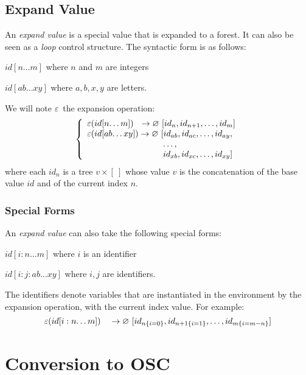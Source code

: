 \documentclass[runningheads,a4paper]{llncs}
\newcommand{\forest}	{\ensuremath{\varnothing}}
\newcommand{\etc}		{\ensuremath{\text{…}}}
\newcommand{\emptyf}	{\ensuremath{[\ ]}}
\newcommand{\nexpand}	{\ensuremath{\varepsilon}}
\newcommand{\ulb}		{\hspace*{31.5mm}}
\begin{document}
\subsection{Expand Value}

An \emph{expand value} is a special value that is expanded to a forest. It can also be seen as a \emph{loop} control structure. The syntactic form is as follows:
\begin{description}
\item $id[n\etc m]$ 	where $n$ and $m$ are integers
\item $id[ab\etc xy]$ where $a,b,x,y$ are letters.
\end{description}
We will note \nexpand\ the expansion operation:
\[
\left\{
\begin{array}{l}
	\nexpand(id[n\etc m])   \ \ \to \forest \ [id_n,id_{n+1},\etc ,id_m] \\
	\nexpand(id[ab\etc xy]) \to \forest \ [id_{ab},id_{ac},\etc ,id_{ay}, \\
	\ulb \etc ,\\
	\ulb id_{xb},id_{xc},\etc ,id_{xy}]
\end{array}
\right.
\]
where each $id_n$ is a tree $v \times \emptyf$ whose value $v$ is the concatenation of the base value $id$ and of the current index $n$.

\subsubsection{Special Forms}

An \emph{expand value} can also take the following special forms: 
\begin{description}
\item $id[i:n\etc m]$ 	where $i$ is an identifier
\item $id[i:j:ab\etc xy]$ where $i,j$ are identifiers.
\end{description}
The identifiers denote variables that are instantiated in the environment by the expansion operation, with the current index value. For example:
\[
	\nexpand(id[i:n\etc m])   \quad \to \forest \ [id_{n\{i=0\}},id_{n+1\{i=1\}},\etc ,id_{m\{i=m-n\}}] \\
\]

\section{Conversion to OSC}\label{sslash}
\end{document}
